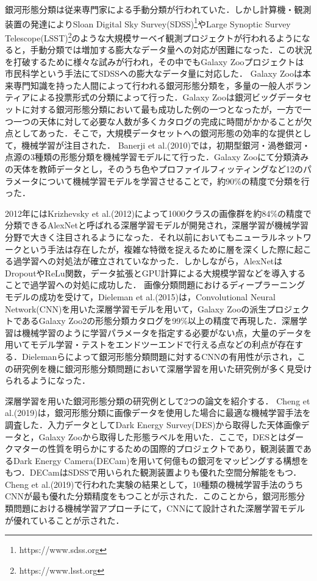 \documentclass[a4j, 11pt]{jreport}
\begin{document}
銀河形態分類は従来専門家による手動分類が行われていた．しかし計算機・観測装置の発達によりSloan Digital Sky Survey(SDSS)\footnote{https://www.sdss.org}やLarge Synoptic Survey Telescope(LSST)\footnote{https://www.lsst.org}のような大規模サーベイ観測プロジェクトが行われるようになると，手動分類では増加する膨大なデータ量への対応が困難になった．この状況を打破するために様々な試みが行われ，その中でもGalaxy Zooプロジェクト\cite{Lintott2008}は市民科学という手法にてSDSSへの膨大なデータ量に対応した．
Galaxy Zooは本来専門知識を持った人間によって行われる銀河形態分類を，多量の一般人ボランティアによる投票形式の分類によって行った．Galaxy Zooは銀河ビッグデータセットに対する銀河形態分類において最も成功した例の一つとなったが，一方で一つ一つの天体に対して必要な人数が多くカタログの完成に時間がかかることが欠点としてあった．そこで，大規模データセットへの銀河形態の効率的な提供として，機械学習が注目された．
Banerji et al.(2010)\cite{Banerji2010}では，初期型銀河・渦巻銀河・点源の3種類の形態分類を機械学習モデルにて行った．Galaxy Zooにて分類済みの天体を教師データとし，そのうち色やプロファイルフィッティングなど12のパラメータについて機械学習モデルを学習させることで，約90\%の精度で分類を行った．

2012年にはKrizhevsky et al.(2012)\cite{Krizhevsky2012}によって1000クラスの画像群を約84\%の精度で分類できるAlexNetと呼ばれる深層学習モデルが開発され，深層学習が機械学習分野で大きく注目されるようになった．それ以前においてもニューラルネットワークという手法は存在したが，複雑な特徴を捉えるために層を深くした際に起こる過学習への対処法が確立されていなかった．しかしながら，AlexNetはDropout\cite{Srivastava2014}やReLu関数\cite{Glorot2011}，データ拡張とGPU計算による大規模学習などを導入することで過学習への対処に成功した．
画像分類問題におけるディープラーニングモデルの成功を受けて，Dieleman et al.(2015)\cite{Dieleman2015}は，Convolutional Neural Network(CNN)を用いた深層学習モデルを用いて，Galaxy Zooの派生プロジェクトであるGalaxy Zoo2の形態分類カタログを99\%以上の精度で再現した．深層学習は機械学習のように学習パラメータを指定する必要がない点，大量のデータを用いてモデル学習・テストをエンドツーエンドで行える点などの利点が存在する．Dielemanらによって銀河形態分類問題に対するCNNの有用性が示され，この研究例を機に銀河形態分類問題において深層学習を用いた研究例が多く見受けられるようになった．

深層学習を用いた銀河形態分類の研究例として2つの論文を紹介する．
Cheng et al.(2019)\cite{Cheng2019}は，銀河形態分類に画像データを使用した場合に最適な機械学習手法を調査した．入力データとしてDark Energy Survey(DES)から取得した天体画像データと，Galaxy Zooから取得した形態ラベルを用いた．ここで，DESとはダークマターの性質を明らかにするための国際的プロジェクトであり，観測装置であるDark Energy Camera(DECam)を用いて何億もの銀河をマッピングする構想をもつ．DECamはSDSSで用いられた観測装置よりも優れた空間分解能をもつ．Cheng et al.(2019)で行われた実験の結果として，10種類の機械学習手法のうちCNNが最も優れた分類精度をもつことが示された．このことから，銀河形態分類問題における機械学習アプローチにて，CNNにて設計された深層学習モデルが優れていることが示された．
\end{document}
